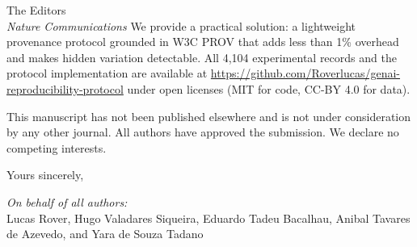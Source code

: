 \documentclass[11pt]{letter}
\begin{document}
\begin{letter}{The Editors\\
\textit{Nature Communications}}
We provide a practical solution: a lightweight provenance protocol grounded in W3C PROV that adds less than 1\% overhead and makes hidden variation detectable. All 4,104 experimental records and the protocol implementation are available at \url{https://github.com/Roverlucas/genai-reproducibility-protocol} under open licenses (MIT for code, CC-BY 4.0 for data).

This manuscript has not been published elsewhere and is not under consideration by any other journal. All authors have approved the submission. We declare no competing interests.

\closing{Yours sincerely,}

\vspace{-1cm}
\noindent\textit{On behalf of all authors:}\\
Lucas Rover, Hugo Valadares Siqueira, Eduardo Tadeu Bacalhau, Anibal Tavares de Azevedo, and Yara de Souza Tadano

\end{letter}
\end{document}
